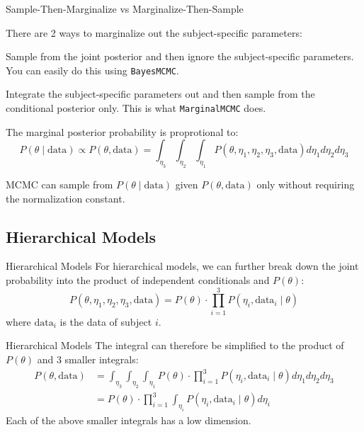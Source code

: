 \begin{frame}{Sample-Then-Marginalize vs Marginalize-Then-Sample}
	\begin{vfilleditems}
		\item There are 2 ways to marginalize out the subject-specific parameters:
			\begin{vfilleditems}
				\item Sample from the joint posterior and then ignore the subject-specific parameters. You can easily do this using \lstinline{BayesMCMC}.
				\item Integrate the subject-specific parameters out and then sample from the conditional posterior only. This is what \lstinline{MarginalMCMC} does.
			\end{vfilleditems}
		\item The marginal posterior probability is proprotional to:
		$$
			P(\theta \mid \text{data}) \propto P(\theta, \text{data}) = \int_{\eta_3} \int_{\eta_2} \int_{\eta_1} P(\theta, \eta_1, \eta_2, \eta_3, \text{data}) d\eta_1 d\eta_2 d\eta_3
		$$
		\item MCMC can sample from $P(\theta \mid \text{data})$ given $P(\theta, \text{data})$ only without requiring the normalization constant.
	\end{vfilleditems}
\end{frame}

\subsection{Hierarchical Models}
\begin{frame}{Hierarchical Models}
    For hierarchical models, we can further break down the joint probability into the product of independent conditionals and $P(\theta)$:
	$$
		P(\theta, \eta_1, \eta_2, \eta_3, \text{data}) = P(\theta) \cdot \prod_{i=1}^3 P(\eta_i, \text{data}_i \mid \theta)
	$$
	where $\text{data}_i$ is the data of subject $i$.
\end{frame}

\begin{frame}{Hierarchical Models}
	The integral can therefore be simplified to the product of $P(\theta)$ and 3 smaller integrals:
	$$
		\begin{aligned}
			P(\theta, \text{data}) & = \int_{\eta_3} \int_{\eta_2} \int_{\eta_1} P(\theta) \cdot \prod_{i=1}^3 P(\eta_i, \text{data}_i \mid \theta) d\eta_1 d\eta_2 d\eta_3 \\
			& = P(\theta) \cdot \prod_{i=1}^3 \int_{\eta_i} P(\eta_i, \text{data}_i \mid \theta) d\eta_i
		\end{aligned}
	$$
	\vfill
	Each of the above smaller integrals has a low dimension.
\end{frame}

